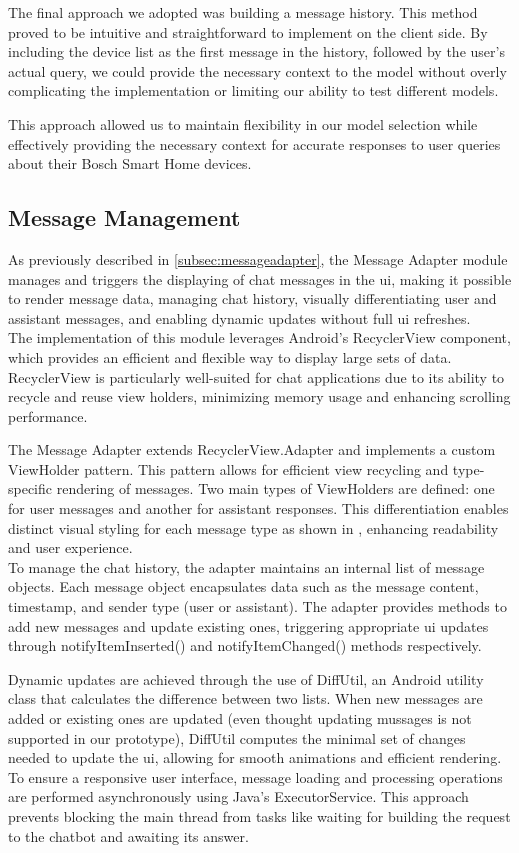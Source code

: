 The final approach we adopted was building a message history. This method proved to be intuitive and straightforward to implement on the client side. By including the device list as the first message in the history, followed by the user's actual query, we could provide the necessary context to the model without overly complicating the implementation or limiting our ability to test different models.

This approach allowed us to maintain flexibility in our model selection while effectively providing the necessary context for accurate responses to user queries about their Bosch Smart Home devices.


\subsection{Message Management}
As previously described in \cref{subsec:messageadapter}, the Message Adapter module manages and triggers the displaying of chat messages in the \gls{ui}, making it possible to render message data, managing chat history, visually differentiating user and assistant messages, and enabling dynamic updates without full \gls{ui} refreshes. \\
The implementation of this module leverages Android's RecyclerView component, which provides an efficient and flexible way to display large sets of data. RecyclerView is particularly well-suited for chat applications due to its ability to recycle and reuse view holders, minimizing memory usage and enhancing scrolling performance.


The Message Adapter extends RecyclerView.Adapter and implements a custom ViewHolder pattern. This pattern allows for efficient view recycling and type-specific rendering of messages. Two main types of ViewHolders are defined: one for user messages and another for assistant responses. This differentiation enables distinct visual styling for each message type as shown in , enhancing readability and user experience.\\
To manage the chat history, the adapter maintains an internal list of message objects. Each message object encapsulates data such as the message content, timestamp, and sender type (user or assistant). The adapter provides methods to add new messages and update existing ones, triggering appropriate \gls{ui} updates through notifyItemInserted() and notifyItemChanged() methods respectively.

Dynamic updates are achieved through the use of DiffUtil, an Android utility class that calculates the difference between two lists. When new messages are added or existing ones are updated (even thought updating mussages is not supported in our prototype), DiffUtil computes the minimal set of changes needed to update the \gls{ui}, allowing for smooth animations and efficient rendering.
To ensure a responsive user interface, message loading and processing operations are performed asynchronously using Java's ExecutorService. This approach prevents blocking the main thread from tasks like waiting for building the request to the chatbot and awaiting its answer.



